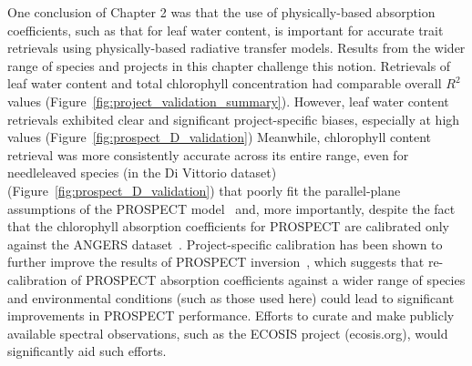 One conclusion of Chapter 2 was that the use of physically-based absorption coefficients, such as that for leaf water content, is important for accurate trait retrievals using physically-based radiative transfer models.
% 
% 
Results from the wider range of species and projects in this chapter challenge this notion.
Retrievals of leaf water content and total chlorophyll concentration had comparable overall $R^2$ values (Figure~\ref{fig:project_validation_summary}).
However, leaf water content retrievals exhibited clear and significant project-specific biases, especially at high values (Figure~\ref{fig:prospect_D_validation})
Meanwhile, chlorophyll content retrieval was more consistently accurate across its entire range, even for needleleaved species (in the Di Vittorio dataset) (Figure~\ref{fig:prospect_D_validation}) that poorly fit the parallel-plane assumptions of the PROSPECT model~\cite{allen_1969_interaction,jacquemoud1990_prospect} and, more importantly, despite the fact that the chlorophyll absorption coefficients for PROSPECT are calibrated only against the ANGERS dataset~\cite{feret2008_prospect,feret2017_prospectd}.
Project-specific calibration has been shown to further improve the results of PROSPECT inversion~\cite{li_2013_retrieval}, which suggests that re-calibration of PROSPECT absorption coefficients against a wider range of species and environmental conditions (such as those used here) could lead to significant improvements in PROSPECT performance.
Efforts to curate and make publicly available spectral observations, such as the ECOSIS project (ecosis.org), would significantly aid such efforts.
% 
% 

